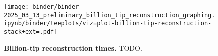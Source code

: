 \begin{center}
\begin{figure}[h]

\texttt{[image: binder/binder-2025\_03\_13\_preliminary\_billion\_tip\_reconstruction\_graphing.ipynb/binder/teeplots/viz=plot-billion-tip-reconstruction-stack+ext=.pdf]}

\caption{\textbf{Billion-tip reconstruction times.} TODO.}
\label{fig:billion-tip-time}
\end{figure}
\end{center}